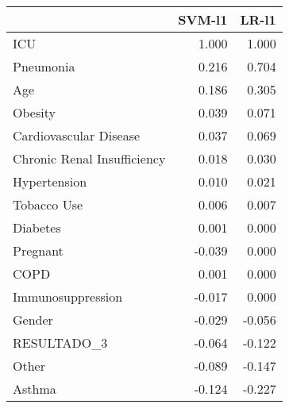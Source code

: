\begin{tabular}{lrr}
\toprule
{} &  SVM-l1 &  LR-l1 \\
\midrule
ICU                         &   1.000 &  1.000 \\
Pneumonia                   &   0.216 &  0.704 \\
Age                         &   0.186 &  0.305 \\
Obesity                     &   0.039 &  0.071 \\
Cardiovascular Disease      &   0.037 &  0.069 \\
Chronic Renal Insufficiency &   0.018 &  0.030 \\
Hypertension                &   0.010 &  0.021 \\
Tobacco Use                 &   0.006 &  0.007 \\
Diabetes                    &   0.001 &  0.000 \\
Pregnant                    &  -0.039 &  0.000 \\
COPD                        &   0.001 &  0.000 \\
Immunosuppression           &  -0.017 &  0.000 \\
Gender                      &  -0.029 & -0.056 \\
RESULTADO\_3                 &  -0.064 & -0.122 \\
Other                       &  -0.089 & -0.147 \\
Asthma                      &  -0.124 & -0.227 \\
\bottomrule
\end{tabular}

